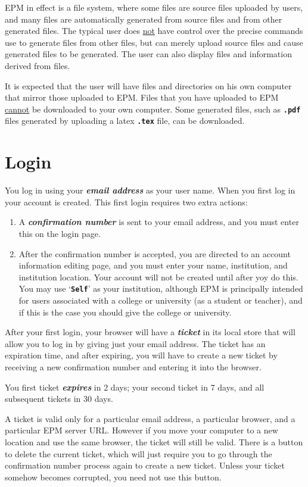 \documentclass[12pt]{article}
\newcommand{\TT}[1]{{\tt \bfseries #1}}
\newcommand{\key}[1]{{\bf \em #1}}
\begin{document}
EPM in effect is a file system, where some files are source
files uploaded by users, and many files are automatically
generated from source files and from other generated files.
The typical user does \underline{not} have control over
the precise commands use to generate files from other
files, but can merely upload source files and cause generated
files to be generated.  The user can also display files
and information derived from files.

It is expected that the user will have files and directories
on his own computer that mirror those uploaded to EPM.
Files that you have uploaded to EPM \underline{cannot}
be downloaded to your own computer.  Some generated files,
such as \TT{.pdf} files generated by uploading a latex
\TT{.tex} file, can be downloaded.

\section{Login}

You log in using your \key{email address} as your user name.
When you first log in your account is created.  This
first login requires two extra actions:
\begin{enumerate}
\item A \key{confirmation number} is sent to your email address,
and you must enter this on the login page.
\item After the confirmation number is accepted, you are
directed to an account information editing page, and you
must enter your name, institution, and institution location.
Your account will not be created until after yoy do this.
You may use `\TT{Self}'
as your institution, although EPM is principally intended
for users associated with a college or university (as
a student or teacher), and if this is the case you should
give the college or university.
\end{enumerate}

After your first login, your browser will have a \key{ticket}
in its local store that will allow you to log in by giving
just your email address.  The ticket has an expiration time,
and after expiring, you will have to create a new ticket
by receiving a new confirmation number and entering it into
the browser.

You first ticket \key{expires} in 2 days; your second ticket in 7 days,
and all subsequent tickets in 30 days.

A ticket is valid only for a particular email address, a particular
browser, and a particular EPM server URL.  However if you move
your computer to a new location and use the same browser, the
ticket will still be valid.  There is a button to delete the
current ticket, which will just require you to go through the
confirmation number process again to create a new ticket.  Unless
your ticket somehow becomes corrupted, you need not use this
button.
\end{document}
